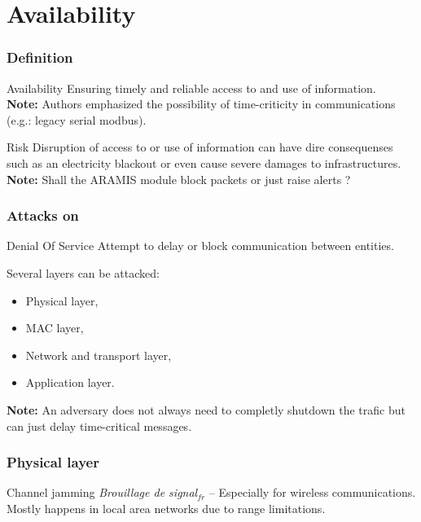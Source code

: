 \documentclass{beamer}
\begin{document}
\section{Availability}

\begin{frame}
    \tableofcontents
\end{frame}

\begin{frame}
    \frametitle{Definition}

    \begin{block}{Availability}
        Ensuring timely and reliable access to and use of information.\\
        \medskip
        {\bf Note:} Authors emphasized the possibility of time-criticity in communications (e.g.: legacy serial modbus).
    \end{block}
    \vfill
    \begin{block}{Risk}
        Disruption of access to or use of information can have dire consequenses such as an electricity blackout or even cause severe damages to infrastructures.\\
        \medskip
        {\bf Note:} Shall the ARAMIS module block packets or just raise alerts ?
    \end{block}
\end{frame}

\begin{frame}
    \frametitle{Attacks on }

    \begin{block}{Denial Of Service}
        Attempt to delay or block communication between entities.
    \end{block}
    \vfill
    Several layers can be attacked:
    \begin{itemize}
        \item Physical layer,
        \item MAC layer,
        \item Network and transport layer,
        \item Application layer.
    \end{itemize}
    \vfill
    {\bf Note:} An adversary does not always need to completly shutdown the trafic but can just delay time-critical messages.
\end{frame}

\begin{frame}
    \frametitle{Physical layer}

    \begin{block}{Channel jamming}
        {\em Brouillage de signal}$_{fr}$ -- Especially for wireless communications.\\
        \medskip
        Mostly happens in local area networks due to range limitations.
    \end{block}
\end{frame}
\end{document}
